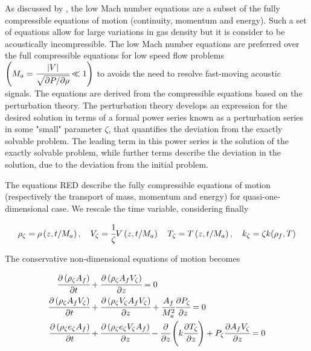 \documentclass[../Parameter_fitting.tex]{subfiles}
\begin{document}
	
	As discussed by \citet{Lions2013}, the low Mach number equations are a subset of the fully compressible equations of motion (continuity, momentum and energy). Such a set of equations allow for large variations in gas density but it is consider to be acoustically incompressible. The low Mach number equations are preferred over the full compressible equations for low speed flow problems $\left( M_a = \cfrac{|V|}{\sqrt{ \partial P / \partial \rho }} \ll 1 \right)$ to avoids the need to resolve fast-moving acoustic signals. The equations are derived from the compressible equations based on the perturbation theory. The perturbation theory develops an expression for the desired solution in terms of a formal power series known as a perturbation series in some "small" parameter $\zeta$, that quantifies the deviation from the exactly solvable problem. The leading term in this power series is the solution of the exactly solvable problem, while further terms describe the deviation in the solution, due to the deviation from the initial problem. 
	
	The equations {\color{red}RED} describe the fully compressible equations of motion (respectively the transport of mass, momentum and energy) for quasi-one-dimensional case. We rescale the time variable, considering finally 
	
	{\footnotesize
		\begin{equation*}
			\rho_\zeta 	= \rho\left( z, t/M_a \right), \quad
			V_\zeta 	= \cfrac{1}{\zeta} V\left( z, t/M_a \right) \quad
			T_\zeta 	= T\left( z, t/M_a \right),  \quad 
			k_\zeta 	= \zeta k(\rho_f, T) 
		\end{equation*} 
	}
	
	The conservative non-dimensional equations of motion becomes
	
	{\footnotesize
		\begin{align*}
			\cfrac{\partial \left( \rho_\zeta A_f \right)}{\partial t} &+ \cfrac{\partial \left( \rho_\zeta A_f V_\zeta \right)}{\partial z} = 0 \\
			\cfrac{\partial \left( \rho_\zeta A_f V_\zeta \right) }{\partial t}	&+ \cfrac{\partial \left( \rho_\zeta V_\zeta A_f V_\zeta \right)}{\partial z} + \cfrac{A_f}{M_a^2} \cfrac{\partial P_\zeta}{\partial z} = 0\\
			\cfrac{\partial \left( \rho_\zeta e_\zeta A_f \right) }{\partial t} &+ \cfrac{\partial \left( \rho_\zeta e_\zeta V_\zeta A_f \right)}{\partial z} - \cfrac{\partial}{\partial z} \left( k \cfrac{\partial T_\zeta}{\partial z} \right) + P_\zeta \cfrac{\partial A_f V_\zeta}{\partial z} = 0
		\end{align*}
	}
\end{document}
